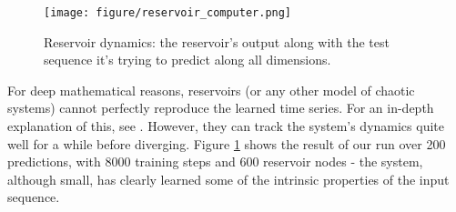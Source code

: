 \begin{figure}
    \centering
    \texttt{[image: figure/reservoir\_computer.png]}
    \caption{Reservoir dynamics: the reservoir's output along with the test sequence it's trying to predict along all dimensions.}
    \label{fig:reservoir_dynamics}
\end{figure}

For deep mathematical reasons, reservoirs (or any other model of chaotic systems) cannot perfectly reproduce the learned time series. For an in-depth explanation of this, see \cite{strogatz2001nonlinear}. However, they can track the system's dynamics quite well for a while before diverging. Figure \ref{fig:reservoir_dynamics} shows the result of our run over 200 predictions, with 8000 training steps and 600 reservoir nodes - the system, although small, has clearly learned some of the intrinsic properties of the input sequence.